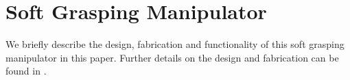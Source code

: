 \section{Soft Grasping Manipulator}
\label{sec:soft_grasping_manipulator}
We briefly describe the design, fabrication and functionality of this soft grasping manipulator in this paper. Further details on the design and fabrication can be found in \cite{marchese2015recipe}.


